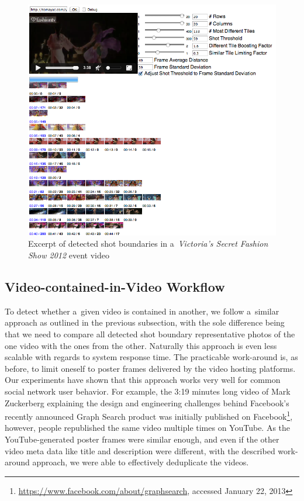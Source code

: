 \begin{figure}[h!]
  \centering
  \includegraphics[width=1.0\linewidth]{./vsfashionshowboundaries.png}
  \caption[Excerpt of detected shot boundaries in an event video]
  {Excerpt of detected shot boundaries in a~\emph{Victoria's Secret Fashion Show 2012} event video}
  \label{fig:vsfashionshowboundaries}
\end{figure}

\subsection{Video-contained-in-Video Workflow}

To detect whether a~given video is contained in another,
we follow a~similar approach as outlined in the previous subsection,
with the sole difference being that we need to compare
all detected shot boundary representative photos of the one video
with the ones from the other.
Naturally this approach is even less scalable
with regards to system response time.
The practicable work-around is, as before, to limit oneself
to poster frames delivered by the video hosting platforms.
Our experiments have shown that this approach works very well
for common social network user behavior.
For example, the 3:19 minutes long video of Mark Zuckerberg explaining
the design and engineering challenges behind Facebook's
recently announced Graph Search product was initially published
on Facebook\footnote{\url{https://www.facebook.com/about/graphsearch},
accessed January 22, 2013}, however, people republished the same video 
multiple times on YouTube.
As the YouTube-generated poster frames were similar enough,
and even if the other video meta data like title and description
were different, with the described work-around approach,
we were able to effectively deduplicate the videos.

